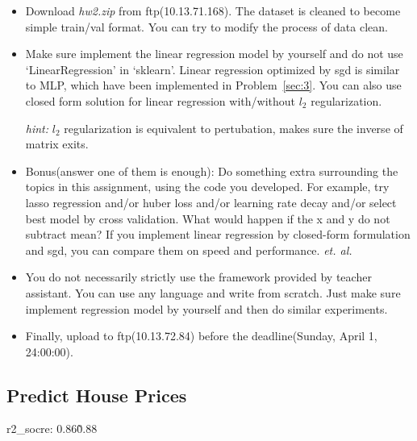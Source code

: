 \documentclass[12pt]{article}
\begin{document}
\begin{itemize}
	\item  Download \textit{hw2.zip} from ftp(10.13.71.168). The dataset is cleaned to become simple train/val format. You can try to modify the process of data clean.
	\item Make sure implement the {linear} regression model by yourself and do not use {{`LinearRegression' in `sklearn'}}.  Linear regression optimized by sgd is similar to MLP, which have been implemented in {Problem~\ref{sec:3}}. You can also use closed form solution for linear regression with/without $l_2$ regularization. 

	\textit{hint:} $l_2$ regularization is equivalent to pertubation, makes sure the inverse of matrix exits.

	\item {{Bonus(answer one of them is enough)}}: Do something extra surrounding the topics in this assignment, using the code you developed. For example, try lasso regression and/or huber loss and/or learning rate decay and/or select best model by cross validation. What would happen if the x and y do not subtract mean? If you implement linear  regression by  closed-form formulation and sgd, you can compare them on speed and performance. \textit{et. al.} 

	\item You do not necessarily strictly use the framework provided by teacher assistant. You can use any language and write from scratch. Just make sure implement regression model by yourself and then do similar experiments.
	\item Finally, upload to ftp(10.13.72.84) before the deadline(Sunday, April 1, 24:00:00).
\end{itemize}

\subsection{Predict House Prices}

r2\_socre: 0.86\~0.88
\end{document}
